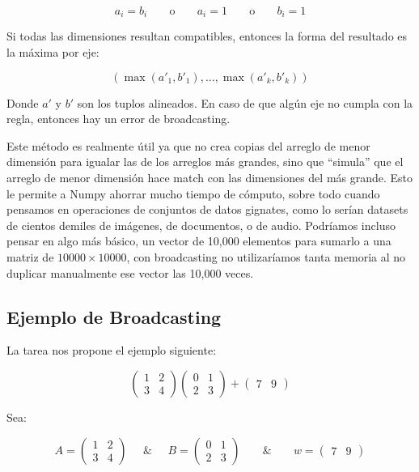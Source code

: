 \[
    a_i = b_i \;\;\;\;\;\;\; \text{o}  \;\;\;\;\;\;\;  a_i = 1  \;\;\;\;\;\;\;  \text{o} \;\;\;\;\;\;\; b_i = 1
\]

Si todas las dimensiones resultan compatibles, entonces la forma del resultado es la máxima por eje:

\[
    (\max(a'_1, b'_1),..., \max(a'_k,b'_k))
\]

Donde $a'$ y $b'$ son los tuplos alineados. En caso de que algún eje no cumpla con la regla, entonces
hay un error de broadcasting. 

Este método es realmente útil ya que no crea copias del arreglo de menor dimensión para igualar las
de los arreglos más grandes, sino que ``simula'' que el arreglo de menor dimensión hace match con las
dimensiones del más grande. Esto le permite a Numpy ahorrar mucho tiempo de cómputo, sobre todo cuando
pensamos en operaciones de conjuntos de datos gignates, como lo serían datasets de cientos demiles de
imágenes, de documentos, o de audio. Podríamos incluso pensar en algo más básico, un vector de 10,000 
elementos para sumarlo a una matriz de $10000 \times 10000$, con broadcasting no utilizaríamos tanta
memoria al no duplicar manualmente ese vector las 10,000 veces.


\subsection{Ejemplo de Broadcasting}

La tarea nos propone el ejemplo siguiente:

\[
    \begin{pmatrix} 1 & 2 \\ 3 & 4 \end{pmatrix} 
    \begin{pmatrix} 0 & 1 \\ 2 & 3 \end{pmatrix} + 
    \begin{pmatrix} 7 & 9 \end{pmatrix}
\]

Sea:

\[
    A = \begin{pmatrix} 1 & 2 \\ 3 & 4 \end{pmatrix} \;\;\;\;\; \& \;\;\;\;\; B = \begin{pmatrix} 0 & 1 \\ 2 & 3 \end{pmatrix} 
    \;\;\;\;\;\;\; \& \;\;\;\;\;\;\; w = \begin{pmatrix} 7 & 9 \end{pmatrix}
\]

